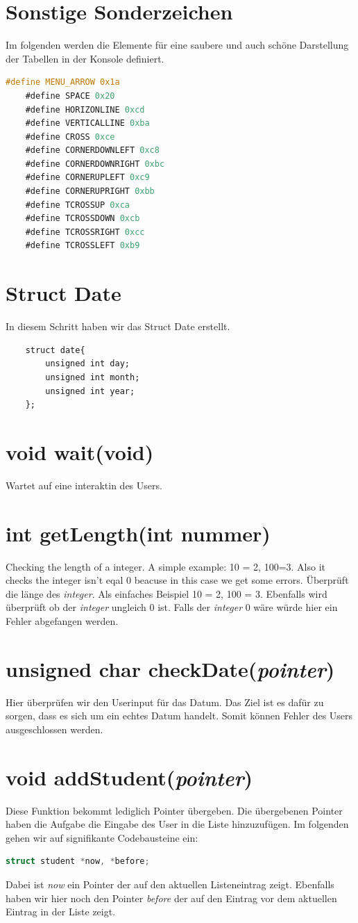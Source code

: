 \documentclass[a4paper, 11pt, oneside]{book} %
\begin{document}
\section{Sonstige Sonderzeichen}
Im folgenden werden die Elemente für eine saubere und auch schöne Darstellung der Tabellen in der Konsole definiert.
\begin{lstlisting}[language=C]
	#define MENU_ARROW 0x1a
	#define SPACE 0x20
	#define HORIZONLINE 0xcd
	#define VERTICALLINE 0xba
	#define CROSS 0xce
	#define CORNERDOWNLEFT 0xc8 
	#define CORNERDOWNRIGHT 0xbc 
	#define CORNERUPLEFT 0xc9 
	#define CORNERUPRIGHT 0xbb 
	#define TCROSSUP 0xca 
	#define TCROSSDOWN 0xcb 
	#define TCROSSRIGHT 0xcc 
	#define TCROSSLEFT 0xb9 
\end{lstlisting}

\section{Struct Date}
In diesem Schritt haben wir das Struct Date erstellt.
\begin{lstlisting}
	struct date{
        unsigned int day;
        unsigned int month;
        unsigned int year;
	};
\end{lstlisting}
\section{void wait(void)}
Wartet auf eine interaktin des Users.
\section{int getLength(int nummer)}
Checking the length of a integer. A simple example: 10 = 2, 100=3. Also it checks the integer isn't eqal 0 beacuse in this case we get some errors.
Überprüft die länge des \textit{integer}. Als einfaches Beispiel 10 = 2, 100 = 3. Ebenfalls wird überprüft ob der \textit{integer} ungleich 0 ist. Falls der \textit{integer} 0 wäre würde hier ein Fehler abgefangen werden.

\section{unsigned char checkDate(\textit{pointer})}
Hier überprüfen wir den Userinput für das Datum. Das Ziel ist es dafür zu sorgen, dass es sich um ein echtes Datum handelt. Somit können Fehler des Users ausgeschlossen werden.

\section{void addStudent(\textit{pointer})}
Diese Funktion bekommt lediglich Pointer übergeben. Die übergebenen Pointer haben die Aufgabe die Eingabe des User in die Liste hinzuzufügen. Im folgenden gehen wir auf signifikante Codebausteine ein:
\begin{lstlisting}[language=C]
	struct student *now, *before;
\end{lstlisting}
Dabei ist \textit{now} ein Pointer der auf den aktuellen Listeneintrag zeigt. Ebenfalls haben wir hier noch den Pointer \textit{before} der auf den Eintrag vor dem aktuellen Eintrag in der Liste zeigt.
\end{document}
